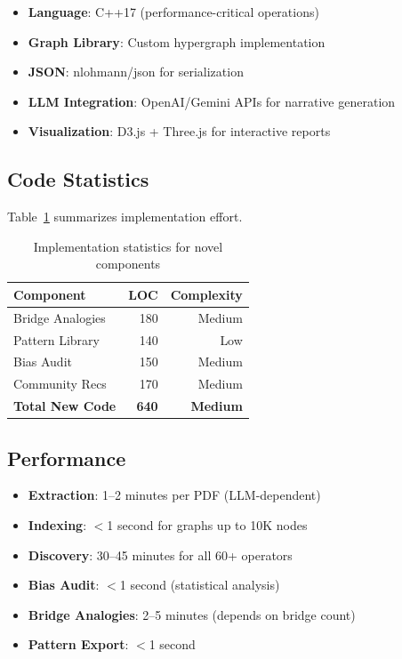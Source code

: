\documentclass[11pt,twocolumn]{article}
\begin{document}
\begin{itemize}
\item \textbf{Language}: C++17 (performance-critical operations)
\item \textbf{Graph Library}: Custom hypergraph implementation
\item \textbf{JSON}: nlohmann/json for serialization
\item \textbf{LLM Integration}: OpenAI/Gemini APIs for narrative generation
\item \textbf{Visualization}: D3.js + Three.js for interactive reports
\end{itemize}

\subsection{Code Statistics}

Table~\ref{tab:code-stats} summarizes implementation effort.

\begin{table}[t]
\centering
\caption{Implementation statistics for novel components}
\label{tab:code-stats}
\begin{tabular}{lrr}
\toprule
\textbf{Component} & \textbf{LOC} & \textbf{Complexity} \\
\midrule
Bridge Analogies & 180 & Medium \\
Pattern Library & 140 & Low \\
Bias Audit & 150 & Medium \\
Community Recs & 170 & Medium \\
\midrule
\textbf{Total New Code} & \textbf{640} & \textbf{Medium} \\
\bottomrule
\end{tabular}
\end{table}

\subsection{Performance}

\begin{itemize}
\item \textbf{Extraction}: 1--2 minutes per PDF (LLM-dependent)
\item \textbf{Indexing}: $<$1 second for graphs up to 10K nodes
\item \textbf{Discovery}: 30--45 minutes for all 60+ operators
\item \textbf{Bias Audit}: $<$1 second (statistical analysis)
\item \textbf{Bridge Analogies}: 2--5 minutes (depends on bridge count)
\item \textbf{Pattern Export}: $<$1 second
\end{itemize}
\end{document}
